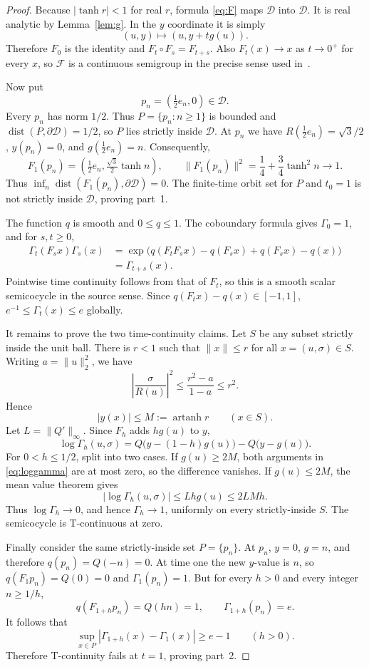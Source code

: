 \documentclass[11pt]{article}
\newcommand{\D}{\mathcal D}
\newcommand{\F}{\mathcal F}
\newcommand{\dist}{\operatorname{dist}}
\begin{document}
\begin{proof}
Because $|\tanh r|<1$ for real $r$, formula \eqref{eq:F} maps $\D$ into
$\D$. It is real analytic by Lemma~\ref{lem:g}. In the $y$ coordinate it is
simply
\[
 (u,y)\longmapsto (u,y+t g(u)).
\]
Therefore $F_0$ is the identity and $F_t\circ F_s=F_{t+s}$. Also
$F_t(x)\to x$ as $t\to0^+$ for every $x$, so $\F$ is a continuous semigroup
in the precise sense used in~\cite{EJK}.

Now put
\[
 p_n=\left(\tfrac12e_n,0\right)\in\D.
\]
Every $p_n$ has norm $1/2$. Thus $P=\{p_n:n\geq1\}$ is bounded and
$\dist(P,\partial\D)=1/2$, so $P$ lies strictly inside $\D$. At $p_n$ we have
$R(\frac12e_n)=\sqrt3/2$, $y(p_n)=0$, and $g(\frac12e_n)=n$. Consequently,
\[
 F_1(p_n)=
 \left(\tfrac12e_n,\tfrac{\sqrt3}{2}\tanh n\right),
 \qquad
 \|F_1(p_n)\|^2=\frac14+\frac34\tanh^2 n\longrightarrow1.
\]
Thus $\inf_n\dist(F_1(p_n),\partial\D)=0$. The finite-time orbit set for
$P$ and $t_0=1$ is not strictly inside $\D$, proving part~1.

The function $q$ is smooth and $0\leq q\leq1$. The coboundary formula gives
$\Gamma_0=1$, and for $s,t\geq0$,
\begin{align*}
 \Gamma_t(F_sx)\Gamma_s(x)
 &=\exp\bigl(q(F_tF_sx)-q(F_sx)+q(F_sx)-q(x)\bigr)\\
 &=\Gamma_{t+s}(x).
\end{align*}
Pointwise time continuity follows from that of $F_t$, so this is a smooth
scalar semicocycle in the source sense. Since $q(F_t x)-q(x)\in[-1,1]$,
$e^{-1}\leq\Gamma_t(x)\leq e$ globally.

It remains to prove the two time-continuity claims. Let $S$ be any subset
strictly inside the unit ball. There is $r<1$ such that $\|x\|\leq r$ for all
$x=(u,\sigma)\in S$. Writing $a=\|u\|_2^2$, we have
\[
 \left|\frac{\sigma}{R(u)}\right|^2
 \leq\frac{r^2-a}{1-a}\leq r^2.
\]
Hence
\begin{equation}\label{eq:ybound}
 |y(x)|\leq M:=\operatorname{artanh}r\qquad(x\in S).
\end{equation}
Let $L=\|Q'\|_\infty$. Since $F_h$ adds $h g(u)$ to $y$,
\begin{equation}\label{eq:loggamma}
 \log\Gamma_h(u,\sigma)
 =Q\bigl(y-(1-h)g(u)\bigr)-Q\bigl(y-g(u)\bigr).
\end{equation}
For $0<h\leq1/2$, split into two cases. If $g(u)\geq2M$, both arguments in
\eqref{eq:loggamma} are at most zero, so the difference vanishes. If
$g(u)\leq2M$, the mean value theorem gives
\[
 |\log\Gamma_h(u,\sigma)|\leq Lh g(u)\leq2LMh.
\]
Thus $\log\Gamma_h\to0$, and hence $\Gamma_h\to1$, uniformly on every
strictly-inside $S$. The semicocycle is T-continuous at zero.

Finally consider the same strictly-inside set $P=\{p_n\}$. At $p_n$,
$y=0$, $g=n$, and therefore $q(p_n)=Q(-n)=0$. At time one the new $y$-value
is $n$, so $q(F_1p_n)=Q(0)=0$ and $\Gamma_1(p_n)=1$. But for every $h>0$ and
every integer $n\geq1/h$,
\[
 q(F_{1+h}p_n)=Q(hn)=1,
 \qquad
 \Gamma_{1+h}(p_n)=e.
\]
It follows that
\[
 \sup_{x\in P}|\Gamma_{1+h}(x)-\Gamma_1(x)|\geq e-1
 \qquad(h>0).
\]
Therefore T-continuity fails at $t=1$, proving part~2.
\end{proof}
\end{document}

